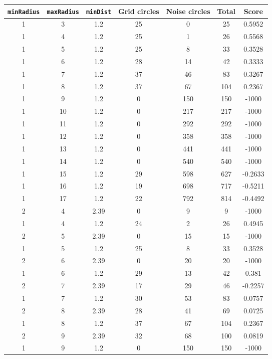 \documentclass[letterpaper, 12pt]{article}
\begin{document}
\begin{longtable}{|c|c|c|c|c|c|c|}
\hline
\textbf{\texttt{minRadius}} & \textbf{\texttt{maxRadius}} & \textbf{\texttt{minDist}} & \textbf{Grid circles} & \textbf{Noise circles} & \textbf{Total} & \textbf{Score} \\
\hline
1 & 3 & 1.2 & 25 & 0 & 25 & 0.5952 \\
\hline
1 & 4 & 1.2 & 25 & 1 & 26 & 0.5568 \\
\hline
1 & 5 & 1.2 & 25 & 8 & 33 & 0.3528 \\
\hline
1 & 6 & 1.2 & 28 & 14 & 42 & 0.3333 \\
\hline
1 & 7 & 1.2 & 37 & 46 & 83 & 0.3267 \\
\hline
1 & 8 & 1.2 & 37 & 67 & 104 & 0.2367 \\
\hline
1 & 9 & 1.2 & 0 & 150 & 150 & -1000 \\
\hline
1 & 10 & 1.2 & 0 & 217 & 217 & -1000 \\
\hline
1 & 11 & 1.2 & 0 & 292 & 292 & -1000 \\
\hline
1 & 12 & 1.2 & 0 & 358 & 358 & -1000 \\
\hline
1 & 13 & 1.2 & 0 & 441 & 441 & -1000 \\
\hline
1 & 14 & 1.2 & 0 & 540 & 540 & -1000 \\
\hline
1 & 15 & 1.2 & 29 & 598 & 627 & -0.2633 \\
\hline
1 & 16 & 1.2 & 19 & 698 & 717 & -0.5211 \\
\hline
1 & 17 & 1.2 & 22 & 792 & 814 & -0.4492 \\
\hline
2 & 4 & 2.39 & 0 & 9 & 9 & -1000 \\
\hline
1 & 4 & 1.2 & 24 & 2 & 26 & 0.4945 \\
\hline
2 & 5 & 2.39 & 0 & 15 & 15 & -1000 \\
\hline
1 & 5 & 1.2 & 25 & 8 & 33 & 0.3528 \\
\hline
2 & 6 & 2.39 & 0 & 20 & 20 & -1000 \\
\hline
1 & 6 & 1.2 & 29 & 13 & 42 & 0.381 \\
\hline
2 & 7 & 2.39 & 17 & 29 & 46 & -0.2257 \\
\hline
1 & 7 & 1.2 & 30 & 53 & 83 & 0.0757 \\
\hline
2 & 8 & 2.39 & 28 & 41 & 69 & 0.0725 \\
\hline
1 & 8 & 1.2 & 37 & 67 & 104 & 0.2367 \\
\hline
2 & 9 & 2.39 & 32 & 68 & 100 & 0.0819 \\
\hline
1 & 9 & 1.2 & 0 & 150 & 150 & -1000 \\

\end{longtable}
\end{document}

